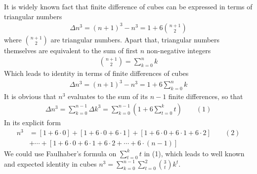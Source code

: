 It is widely known fact that finite difference of cubes can be expressed in terms of triangular numbers
\begin{align*}
    \Delta n^3 = (n+1)^3 - n^3 = 1 + 6 \binom{n+1}{2}
\end{align*}
where $\binom{n+1}{2}$ are triangular numbers.
Apart that, triangular numbers themselves are equivalent to the sum of first $n$ non-negative integers
\begin{align*}
    \binom{n+1}{2} = \sum_{k=0}^{n} k
\end{align*}
Which leads to identity in terms of finite differences of cubes
\begin{align*}
    \Delta n^3 = (n+1)^3 - n^3 = 1 + 6 \sum_{k=0}^{n} k
\end{align*}
It is obvious that $n^3$ evaluates to the sum of its $n-1$ finite differences, so that
\begin{align*}
    \Delta n^3 = \sum_{k=0}^{n-1} \Delta k^3 = \sum_{k=0}^{n-1} \left( 1 + 6 \sum_{t=0}^{k} t \right)
    \quad \quad (1)
\end{align*}
In its explicit form
\begin{align*}
    n^3 &= [1+6\cdot0]+[1+6\cdot0+6\cdot1]+[1+6\cdot0+6\cdot1+6\cdot2]  \quad \quad (2) \\
    &+ \cdots + [1+6\cdot0+6\cdot1+6\cdot2+\cdots+6\cdot(n-1)]
\end{align*}
We could use Faulhaber's formula on $\sum_{t=0}^{k} t$ in (1),
which leads to well known and expected identity in cubes $n^3 = \sum_{k=0}^{n-1} \sum_{t=0}^{2} \binom{3}{t} k^t$.

